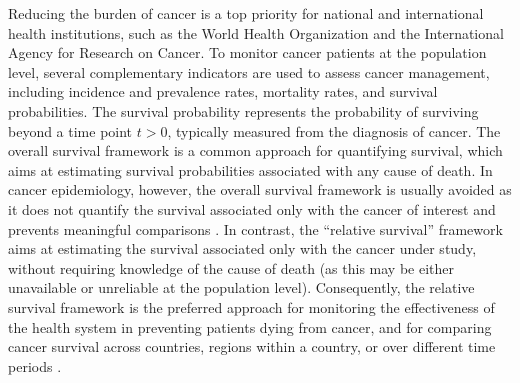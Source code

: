 \documentclass[12pt]{article}
\begin{document}
Reducing the burden of cancer is a top priority for national and international health institutions, such as the World Health Organization and the International Agency for Research on Cancer. To monitor cancer patients at the population level, several complementary indicators are used to assess cancer management, including incidence and prevalence rates, mortality rates, and survival probabilities. The survival probability represents the probability of surviving beyond a time point $t>0$, typically measured from the diagnosis of cancer. The overall survival framework is a common approach for quantifying survival, which aims at estimating survival probabilities associated with any cause of death. In cancer epidemiology, however, the overall survival framework is usually avoided as it does not quantify the survival associated only with the cancer of interest and prevents meaningful comparisons \citep{mariotto:2014,govuk:2024}. In contrast, the ``relative survival'' framework \citep{perme:2012} aims at estimating the survival associated only with the cancer under study, without requiring knowledge of the cause of death (as this may be either unavailable or unreliable at the population level). Consequently, the relative survival framework is the preferred approach for monitoring the effectiveness of the health system in preventing patients dying from cancer, and for comparing cancer survival across countries, regions within a country, or over different time periods \citep{mariotto:2014,govuk:2024,quaresma:2024}. 
\end{document}
